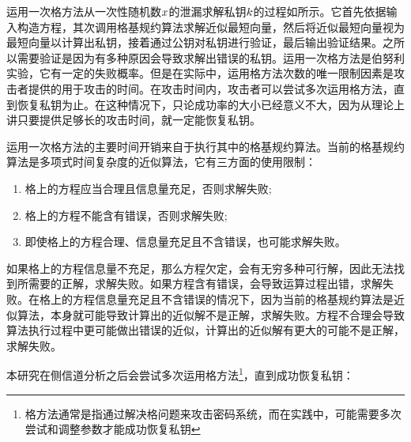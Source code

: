 {	运用一次格方法从一次性随机数$x$的泄漏求解私钥$k$的过程如所示。它首先依据输入构造方程，其次调用格基规约算法求解近似最短向量，然后将近似最短向量视为最短向量以计算出私钥，接着通过公钥对私钥进行验证，最后输出验证结果。之所以需要验证是因为有多种原因会导致求解出错误的私钥。运用一次格方法是伯努利实验，它有一定的失败概率。但是在实际中，运用格方法次数的唯一限制因素是攻击者提供的用于攻击的时间。在攻击时间内，攻击者可以尝试多次运用格方法，直到恢复私钥为止。在这种情况下，只论成功率的大小已经意义不大，因为从理论上讲只要提供足够长的攻击时间，就一定能恢复私钥。%
	
	运用一次格方法的主要时间开销来自于执行其中的格基规约算法。当前的格基规约算法是多项式时间复杂度的近似算法，它有三方面的使用限制：
	
	\begin{enumerate}
		\item 格上的方程应当合理且信息量充足，否则求解失败;
		\item 格上的方程不能含有错误，否则求解失败;
		\item 即使格上的方程合理、信息量充足且不含错误，也可能求解失败。
	\end{enumerate}
	
	如果格上的方程信息量不充足，那么方程欠定，会有无穷多种可行解，因此无法找到所需要的正解，求解失败。如果方程含有错误，会导致运算过程出错，求解失败。在格上的方程信息量充足且不含错误的情况下，因为当前的格基规约算法是近似算法，本身就可能导致计算出的近似解不是正解，求解失败。方程不合理会导致算法执行过程中更可能做出错误的近似，计算出的近似解有更大的可能不是正解，求解失败。
	
	本研究在侧信道分析之后会尝试多次运用格方法\footnote{格方法通常是指通过解决格问题来攻击密码系统，而在实践中，可能需要多次尝试和调整参数才能成功恢复私钥}，直到成功恢复私钥：
	
}
